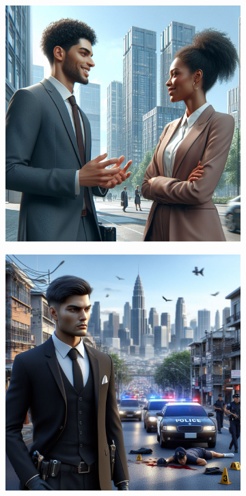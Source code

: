 \documentclass[a4paper,10pt,english]{article}
\begin{document}
\begin{figure}[h]

\centering

\begin{subfigure}{0.29\linewidth}
\includegraphics[width=\linewidth]{figA}
\label{Fig:Style1A}
\end{subfigure}\hfill
%
\begin{subfigure}{0.29\linewidth}
\includegraphics[width=\linewidth]{figB}

\end{subfigure}
\end{figure}
\end{document}
